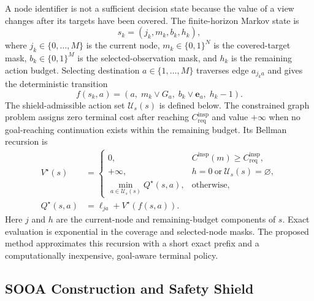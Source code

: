 \documentclass{IEEEtaes}
\theoremstyle{remark}
\theoremstyle{plain}
\begin{document}
A node identifier is not a sufficient decision state because the value of a view changes after its targets have been covered. The finite-horizon Markov state is
\begin{equation}
  s_k=(j_k,m_k,b_k,h_k),
  \label{eq:mdp-state}
\end{equation}
where $j_k\in\{0,\ldots,M\}$ is the current node, $m_k\in\{0,1\}^{N}$ is the covered-target mask, $b_k\in\{0,1\}^{M}$ is the selected-observation mask, and $h_k$ is the remaining action budget. Selecting destination $a\in\{1,\ldots,M\}$ traverses edge $a_{j_ka}$ and gives the deterministic transition
\begin{equation}
  f(s_k,a)=\left(a,\;m_k\lor G_a,\;b_k\lor\mathbf e_a,\;h_k-1\right).
  \label{eq:mdp-transition}
\end{equation}
The shield-admissible action set $\mathcal U_s(s)$ is defined below. The constrained graph problem assigns zero terminal cost after reaching $C_{\mathrm{req}}^{\mathrm{insp}}$ and value $+\infty$ when no goal-reaching continuation exists within the remaining budget. Its Bellman recursion is
\begin{equation}
  \begin{aligned}
  V^\star(s)&=
    \begin{cases}
    0, & C^{\mathrm{insp}}(m)\ge C_{\mathrm{req}}^{\mathrm{insp}},\\
    +\infty, & h=0\ \text{or}\ \mathcal U_s(s)=\varnothing,\\
    \min\limits_{a\in\mathcal U_s(s)}
      Q^\star(s,a), & \text{otherwise},
    \end{cases}\\
  Q^\star(s,a)&=\ell_{j a}+V^\star(f(s,a)).
  \end{aligned}
  \label{eq:bellman}
\end{equation}
Here $j$ and $h$ are the current-node and remaining-budget components of $s$. Exact evaluation is exponential in the coverage and selected-node masks. The proposed method approximates this recursion with a short exact prefix and a computationally inexpensive, goal-aware terminal policy.

\subsection{SOOA Construction and Safety Shield}
\end{document}
